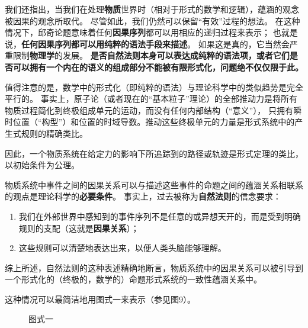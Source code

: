 \documentclass[a4paper,12pt]{article}
\begin{document}
我们还指出，当我们在处理\textbf{\gls{物质}}世界时（相对于形式的数学和\gls{逻辑}），\gls{蕴涵}的观念被\gls{因果}的观念所取代。
尽管如此，我们仍然可以保留“有效”过程的想法。 在这种情况下，\gls{邱奇论题}意味着任何\textbf{\gls{因果序列}}都可以用相应的递归过程来表示；
也就是说，\textbf{任何\gls{因果序列}都可以用纯粹的\gls{语法}手段来描述}。 如果这是真的，它当然会严重限制\textbf{物理学}的发展。
\textbf{是否\gls{自然法则}本身可以表达成纯粹的\gls{语法项}，或者它们是否可以拥有一个内在的\gls{语义}的组成部分不能被有限\gls{形式化}，问题绝不仅仅限于此。}

值得注意的是，数学中的\gls{形式化}（即纯粹的\gls{语法}）与理论科学中的类似趋势是完全平行的。
事实上，原子论（或者现在的“基本粒子”理论）的全部推动力是将所有\gls{物质过程}简化到终极组成单元的运动，而没有任何内部结构（“意义”），
只拥有瞬时位置（“构型”）和位置的时域导数。推动这些终极单元的力量是\gls{形式系统}中的产生式规则的精确类比。

因此，一个\gls{物质系统}在给定力的影响下所追踪到的路径或轨迹是形式\gls{定理}的类比，以初始条件为\gls{公理}。

\gls{物质系统}中\gls{事件}之间的\gls{因果关系}可以与描述这些事件的\gls{命题}之间的\gls{蕴涵关系}相联系的观点是理论科学的\textbf{必要条件}。
事实上，过去被称为\textbf{\gls{自然法则}}的信念要求：
\begin{enumerate}[label=(\alph*)]
\item 我们在外部世界中感知到的\gls{事件序列}不是任意的或异想天开的，而是受到明确规则的支配（这就是\textbf{\gls{因果关系}}）；
\item 这些规则可以清楚地表达出来，以便人类头脑能够理解。
\end{enumerate}
综上所述，\gls{自然法则}的这种表述精确地断言，\gls{物质系统}中的\gls{因果关系}可以被引导到一个\gls{形式化}的（终极的，数学的）命题形式系统的一致性\gls{蕴涵关系}中。

这种情况可以最简洁地用图式一来表示（参见图9）。

\begin{figure}[ht]
\centering
{}
\caption{图式一}
\end{figure}
\end{document}
